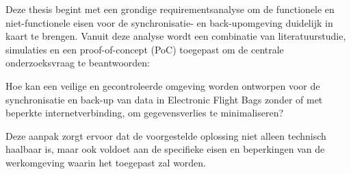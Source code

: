 





Deze thesis begint met een grondige requirementsanalyse om de functionele en niet-functionele eisen voor de synchronisatie- en back-upomgeving duidelijk in kaart te brengen. Vanuit deze analyse wordt een combinatie van literatuurstudie, simulaties en een proof-of-concept (PoC) toegepast om de centrale onderzoeksvraag te beantwoorden:

Hoe kan een veilige en gecontroleerde omgeving worden ontworpen voor de synchronisatie en back-up van data in Electronic Flight Bags zonder of met beperkte internetverbinding, om gegevensverlies te minimaliseren?

Deze aanpak zorgt ervoor dat de voorgestelde oplossing niet alleen technisch haalbaar is, maar ook voldoet aan de specifieke eisen en beperkingen van de werkomgeving waarin het toegepast zal worden.

